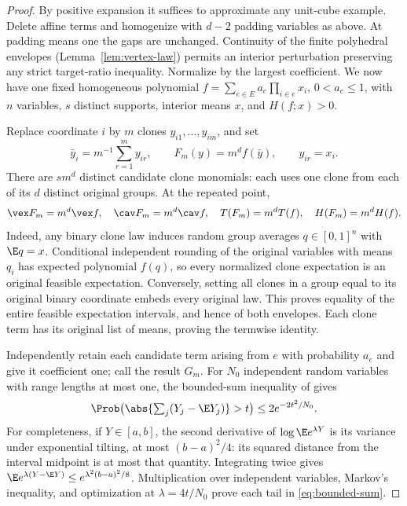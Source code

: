 \begin{proof}
By positive expansion it suffices to approximate any unit-cube example.
Delete affine terms and homogenize with $d-2$ padding variables as above.
At padding means one the gaps are unchanged. Continuity of the finite
polyhedral envelopes (Lemma~\ref{lem:vertex-law}) permits an interior
perturbation preserving any strict target-ratio inequality. Normalize by
the largest coefficient. We now have one fixed homogeneous polynomial
$f=\sum_{e\in E}a_e\prod_{i\in e}x_i$, $0<a_e\le1$, with $n$ variables,
$s$ distinct supports, interior means $x$, and $H(f;x)>0$.

Replace coordinate $i$ by $m$ clones $y_{i1},\ldots,y_{im}$, and set
\[
 \bar y_i=m^{-1}\sum_{r=1}^my_{ir},\qquad F_m(y)=m^df(\bar y),
 \qquad y_{ir}=x_i.
\]
There are $sm^d$ distinct candidate clone monomials: each uses one clone
from each of its $d$ distinct original groups. At the repeated point,
\begin{equation}\label{eq:clone-envelopes}
 \vex F_m=m^d\vex f,\quad \cav F_m=m^d\cav f,\quad
 T(F_m)=m^dT(f),\quad H(F_m)=m^dH(f).
\end{equation}
Indeed, any binary clone law induces random group averages $q\in[0,1]^n$
with $\E q=x$. Conditional independent rounding of the original variables
with means $q_i$ has expected polynomial $f(q)$, so every normalized clone
expectation is an original feasible expectation. Conversely, setting all
clones in a group equal to its original binary coordinate embeds every
original law. This proves equality of the entire feasible expectation
intervals, and hence of both envelopes. Each clone term has its original
list of means, proving the termwise identity.

Independently retain each candidate term arising from $e$ with probability
$a_e$ and give it coefficient one; call the result $G_m$. For $N_0$
independent random variables with range lengths at most one, the bounded-sum
inequality of \citet[Theorem~2]{Hoeffding1963} gives
\begin{equation}\label{eq:bounded-sum}
 \Prob\bigl(\abs{\textstyle\sum_j(Y_j-\E Y_j)}>t\bigr)
 \le2e^{-2t^2/N_0}.
\end{equation}
For completeness, if $Y\in[a,b]$, the second derivative of
$\log\E e^{\lambda Y}$ is its variance under exponential tilting, at most
$(b-a)^2/4$: its squared distance from the interval midpoint is at most
that quantity. Integrating twice gives
$\E e^{\lambda(Y-\E Y)}\le e^{\lambda^2(b-a)^2/8}$.
Multiplication over independent variables, Markov's inequality, and
optimization at $\lambda=4t/N_0$ prove each tail in \eqref{eq:bounded-sum}.


\end{proof}
